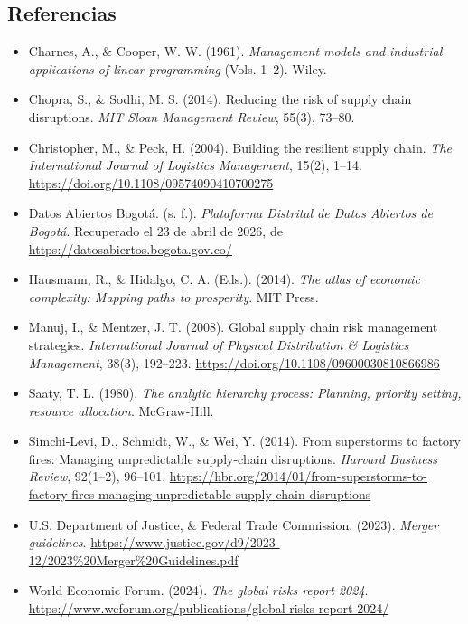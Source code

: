 \documentclass[11pt,a4paper]{article}
\begin{document}
\subsection*{Referencias}
\footnotesize
\begin{itemize}
    \item Charnes, A., \& Cooper, W. W. (1961). \textit{Management models and industrial applications of linear programming} (Vols. 1--2). Wiley.

    \item Chopra, S., \& Sodhi, M. S. (2014). Reducing the risk of supply chain disruptions. \textit{MIT Sloan Management Review}, 55(3), 73--80.

    \item Christopher, M., \& Peck, H. (2004). Building the resilient supply chain. \textit{The International Journal of Logistics Management}, 15(2), 1--14. \url{https://doi.org/10.1108/09574090410700275}

    \item Datos Abiertos Bogotá. (s. f.). \textit{Plataforma Distrital de Datos Abiertos de Bogotá}. Recuperado el 23 de abril de 2026, de \url{https://datosabiertos.bogota.gov.co/}

    \item Hausmann, R., \& Hidalgo, C. A. (Eds.). (2014). \textit{The atlas of economic complexity: Mapping paths to prosperity}. MIT Press.

    \item Manuj, I., \& Mentzer, J. T. (2008). Global supply chain risk management strategies. \textit{International Journal of Physical Distribution \& Logistics Management}, 38(3), 192--223. \url{https://doi.org/10.1108/09600030810866986}

    \item Saaty, T. L. (1980). \textit{The analytic hierarchy process: Planning, priority setting, resource allocation}. McGraw-Hill.

    \item Simchi-Levi, D., Schmidt, W., \& Wei, Y. (2014). From superstorms to factory fires: Managing unpredictable supply-chain disruptions. \textit{Harvard Business Review}, 92(1--2), 96--101. \url{https://hbr.org/2014/01/from-superstorms-to-factory-fires-managing-unpredictable-supply-chain-disruptions}

    \item U.S. Department of Justice, \& Federal Trade Commission. (2023). \textit{Merger guidelines}. \url{https://www.justice.gov/d9/2023-12/2023\%20Merger\%20Guidelines.pdf}

    \item World Economic Forum. (2024). \textit{The global risks report 2024}. \url{https://www.weforum.org/publications/global-risks-report-2024/}
\end{itemize}
\end{document}
